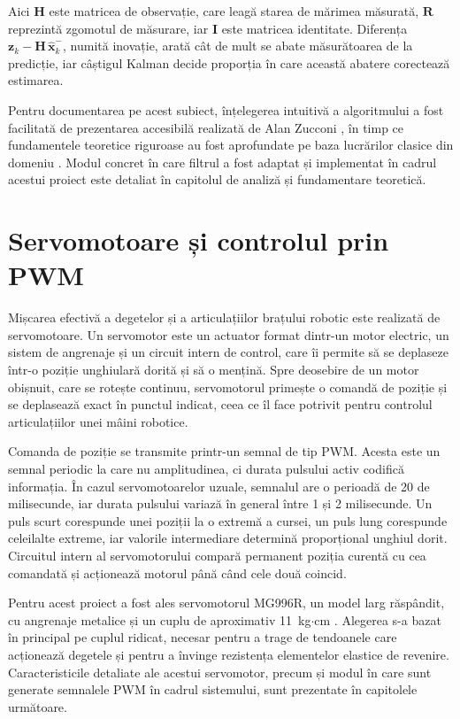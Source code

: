 Aici $\mathbf{H}$ este matricea de observație, care leagă starea de mărimea
măsurată, $\mathbf{R}$ reprezintă zgomotul de măsurare, iar $\mathbf{I}$ este
matricea identitate. Diferența $\mathbf{z}_k - \mathbf{H}\,\hat{\mathbf{x}}_{k}^{-}$,
numită inovație, arată cât de mult se abate măsurătoarea de la predicție, iar
câștigul Kalman decide proporția în care această abatere corectează estimarea.

Pentru documentarea pe acest subiect, înțelegerea intuitivă a algoritmului a fost
facilitată de prezentarea accesibilă realizată de Alan Zucconi \cite{zucconi2022},
în timp ce fundamentele teoretice riguroase au fost aprofundate pe baza lucrărilor
clasice din domeniu \cite{welch1995}. Modul concret în care filtrul a fost adaptat
și implementat în cadrul acestui proiect este detaliat în capitolul de analiză și
fundamentare teoretică.

\section{Servomotoare și controlul prin PWM}
\label{sec:biblio-servo}

Mișcarea efectivă a degetelor și a articulațiilor brațului robotic este realizată
de servomotoare. Un servomotor este un actuator format dintr-un motor electric,
un sistem de angrenaje și un circuit intern de control, care îi permite să se
deplaseze într-o poziție unghiulară dorită și să o mențină. Spre deosebire de un
motor obișnuit, care se rotește continuu, servomotorul primește o comandă de
poziție și se deplasează exact în punctul indicat, ceea ce îl face potrivit pentru
controlul articulațiilor unei mâini robotice.

Comanda de poziție se transmite printr-un semnal de tip PWM. Acesta este un semnal
periodic la care
nu amplitudinea, ci durata pulsului activ codifică informația. În cazul
servomotoarelor uzuale, semnalul are o perioadă de 20 de milisecunde, iar durata
pulsului variază în general între 1 și 2 milisecunde. Un puls scurt corespunde unei
poziții la o extremă a cursei, un puls lung corespunde celeilalte extreme, iar
valorile intermediare determină proporțional unghiul dorit. Circuitul intern al
servomotorului compară permanent poziția curentă cu cea comandată și acționează
motorul până când cele două coincid.

Pentru acest proiect a fost ales servomotorul MG996R, un model larg răspândit, cu
angrenaje metalice și un cuplu de aproximativ 11~kg$\cdot$cm \cite{mg996r_datasheet}.
Alegerea s-a bazat în principal pe cuplul ridicat, necesar pentru a trage de
tendoanele care acționează degetele și pentru a învinge rezistența elementelor
elastice de revenire. Caracteristicile detaliate ale acestui servomotor, precum și
modul în care sunt generate semnalele PWM în cadrul sistemului, sunt prezentate în
capitolele următoare.

